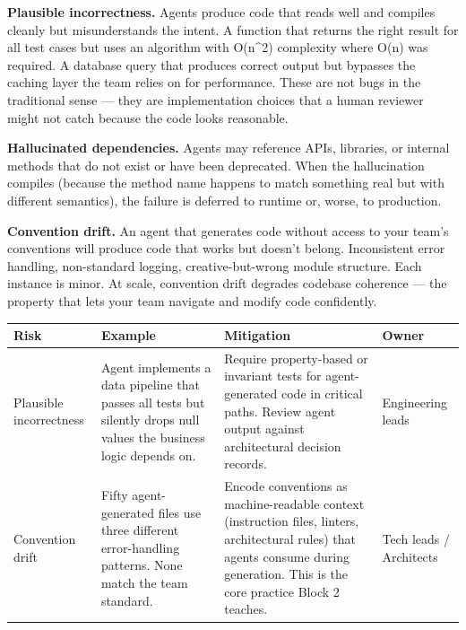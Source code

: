 \documentclass[
  a4paper,
  DIV=11,
  numbers=noendperiod]{scrreprt}
\newcounter{none} %
\begin{document}
\textbf{Plausible incorrectness.} Agents produce code that reads well
and compiles cleanly but misunderstands the intent. A function that
returns the right result for all test cases but uses an algorithm with
O(n\^{}2) complexity where O(n) was required. A database query that
produces correct output but bypasses the caching layer the team relies
on for performance. These are not bugs in the traditional sense --- they
are implementation choices that a human reviewer might not catch because
the code looks reasonable.

\textbf{Hallucinated dependencies.} Agents may reference APIs,
libraries, or internal methods that do not exist or have been
deprecated. When the hallucination compiles (because the method name
happens to match something real but with different semantics), the
failure is deferred to runtime or, worse, to production.

\textbf{Convention drift.} An agent that generates code without access
to your team's conventions will produce code that works but doesn't
belong. Inconsistent error handling, non-standard logging,
creative-but-wrong module structure. Each instance is minor. At scale,
convention drift degrades codebase coherence --- the property that lets
your team navigate and modify code confidently.

{\def\LTcaptype{none} %
\begin{longtable}[]{@{}
  >{\raggedright\arraybackslash}p{}
  >{\raggedright\arraybackslash}p{}
  >{\raggedright\arraybackslash}p{}
  >{\raggedright\arraybackslash}p{}@{}}
\toprule\noalign{}
\begin{minipage}[b]{\linewidth}\raggedright
Risk
\end{minipage} & \begin{minipage}[b]{\linewidth}\raggedright
Example
\end{minipage} & \begin{minipage}[b]{\linewidth}\raggedright
Mitigation
\end{minipage} & \begin{minipage}[b]{\linewidth}\raggedright
Owner
\end{minipage} \\
\midrule\noalign{}
\endhead
\bottomrule\noalign{}
\endlastfoot
Plausible incorrectness & Agent implements a data pipeline that passes
all tests but silently drops null values the business logic depends on.
& Require property-based or invariant tests for agent-generated code in
critical paths. Review agent output against architectural decision
records. & Engineering leads \\
Convention drift & Fifty agent-generated files use three different
error-handling patterns. None match the team standard. & Encode
conventions as machine-readable context (instruction files, linters,
architectural rules) that agents consume during generation. This is the
core practice Block 2 teaches. & Tech leads / Architects \\
\end{longtable}
}
\end{document}
